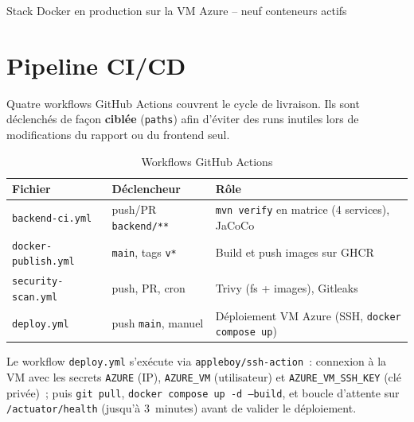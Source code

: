 {Stack Docker en production sur la VM Azure -- neuf conteneurs actifs}

\section{Pipeline CI/CD}

Quatre workflows GitHub Actions couvrent le cycle de livraison. Ils sont
déclenchés de façon \textbf{ciblée} (\texttt{paths}) afin d'éviter des runs
inutiles lors de modifications du rapport ou du frontend seul.

\begin{table}[H]
  \caption{Workflows GitHub Actions}
  \label{tab:workflows}
  \centering\small
  \begin{tabularx}{\textwidth}{|L{3.8cm}|L{4cm}|X|}
    \hline
    \textbf{Fichier} & \textbf{Déclencheur} & \textbf{Rôle} \\
    \hline
    \texttt{backend-ci.yml} & push/PR \texttt{backend/**} &
    \texttt{mvn verify} en matrice (4 services), JaCoCo \\
    \hline
    \texttt{docker-publish.yml} & \texttt{main}, tags \texttt{v*} &
    Build et push images sur GHCR \\
    \hline
    \texttt{security-scan.yml} & push, PR, cron &
    Trivy (fs + images), Gitleaks \\
    \hline
    \texttt{deploy.yml} & push \texttt{main}, manuel &
    Déploiement VM Azure (SSH, \texttt{docker compose up}) \\
    \hline
  \end{tabularx}
\end{table}

Le workflow \texttt{deploy.yml} s'exécute via \texttt{appleboy/ssh-action}~:
connexion à la VM avec les secrets \texttt{AZURE} (IP), \texttt{AZURE\_VM}
(utilisateur) et \texttt{AZURE\_VM\_SSH\_KEY} (clé privée)~; puis
\texttt{git pull}, \texttt{docker compose up -d --build}, et boucle d'attente
sur \texttt{/actuator/health} (jusqu'à 3~minutes) avant de valider le déploiement.


